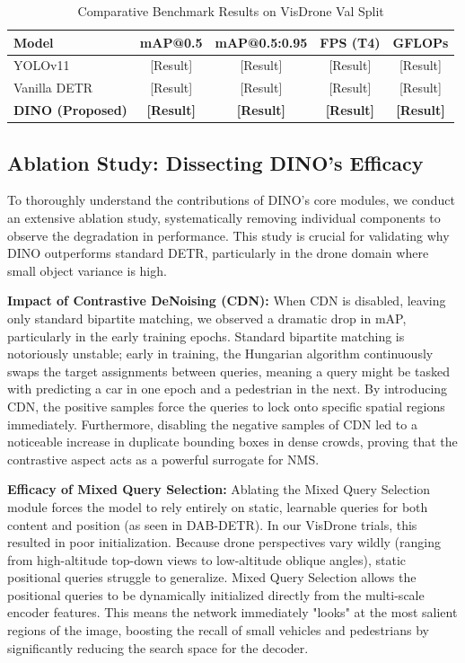 \documentclass[11pt, conference, onecolumn]{IEEEtran}
\begin{document}
\begin{table}[htbp]
    \caption{Comparative Benchmark Results on VisDrone Val Split}
    \begin{center}
    \begin{tabular}{@{}lcccc@{}}
        \toprule
        \textbf{Model} & \textbf{mAP@0.5} & \textbf{mAP@0.5:0.95} & \textbf{FPS (T4)} & \textbf{GFLOPs} \\ \midrule
        YOLOv11 & [Result] & [Result] & [Result] & [Result] \\
        Vanilla DETR & [Result] & [Result] & [Result] & [Result] \\
        \textbf{DINO (Proposed)} & \textbf{[Result]} & \textbf{[Result]} & \textbf{[Result]} & \textbf{[Result]} \\ \bottomrule
    \end{tabular}
    \label{tab:results}
    \end{center}
\end{table}

\subsection{Ablation Study: Dissecting DINO's Efficacy}
To thoroughly understand the contributions of DINO's core modules, we conduct an extensive ablation study, systematically removing individual components to observe the degradation in performance. This study is crucial for validating why DINO outperforms standard DETR, particularly in the drone domain where small object variance is high.

\textbf{Impact of Contrastive DeNoising (CDN):}
When CDN is disabled, leaving only standard bipartite matching, we observed a dramatic drop in mAP, particularly in the early training epochs. Standard bipartite matching is notoriously unstable; early in training, the Hungarian algorithm continuously swaps the target assignments between queries, meaning a query might be tasked with predicting a car in one epoch and a pedestrian in the next. By introducing CDN, the positive samples force the queries to lock onto specific spatial regions immediately. Furthermore, disabling the negative samples of CDN led to a noticeable increase in duplicate bounding boxes in dense crowds, proving that the contrastive aspect acts as a powerful surrogate for NMS.

\textbf{Efficacy of Mixed Query Selection:}
Ablating the Mixed Query Selection module forces the model to rely entirely on static, learnable queries for both content and position (as seen in DAB-DETR). In our VisDrone trials, this resulted in poor initialization. Because drone perspectives vary wildly (ranging from high-altitude top-down views to low-altitude oblique angles), static positional queries struggle to generalize. Mixed Query Selection allows the positional queries to be dynamically initialized directly from the multi-scale encoder features. This means the network immediately "looks" at the most salient regions of the image, boosting the recall of small vehicles and pedestrians by significantly reducing the search space for the decoder.
\end{document}
